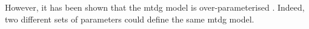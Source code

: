 However, it has been shown that the \gls{mtdg} model is over-parameterised \cite{lebre2008algorithm}.
Indeed, two different sets of parameters could define the same \gls{mtdg} model.
%
%
%
%
